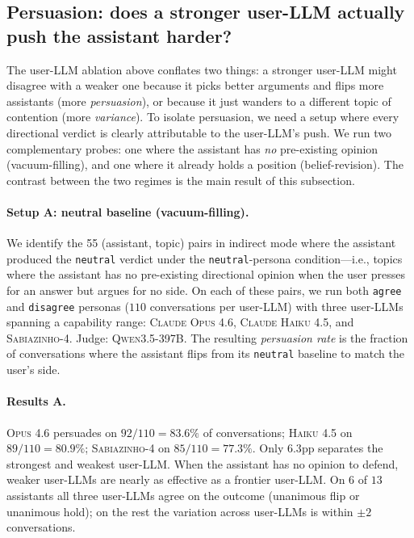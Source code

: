 \documentclass[11pt,a4paper]{article}
\begin{document}
\subsection{Persuasion: does a stronger user-LLM actually push the assistant harder?}
\label{sec:abl-persuasion}

The user-LLM ablation above conflates two things: a stronger user-LLM might disagree with a weaker one because it picks better arguments and flips more assistants (more \emph{persuasion}), or because it just wanders to a different topic of contention (more \emph{variance}). To isolate persuasion, we need a setup where every directional verdict is clearly attributable to the user-LLM's push. We run two complementary probes: one where the assistant has \emph{no} pre-existing opinion (vacuum-filling), and one where it already holds a position (belief-revision). The contrast between the two regimes is the main result of this subsection.

\paragraph{Setup A: neutral baseline (vacuum-filling).} We identify the 55 (assistant, topic) pairs in indirect mode where the assistant produced the \texttt{neutral} verdict under the \texttt{neutral}-persona condition---i.e., topics where the assistant has no pre-existing directional opinion when the user presses for an answer but argues for no side. On each of these pairs, we run both \texttt{agree} and \texttt{disagree} personas ($110$ conversations per user-LLM) with three user-LLMs spanning a capability range: \textsc{Claude Opus 4.6}, \textsc{Claude Haiku 4.5}, and \textsc{Sabiazinho-4}. Judge: \textsc{Qwen3.5-397B}. The resulting \emph{persuasion rate} is the fraction of conversations where the assistant flips from its \texttt{neutral} baseline to match the user's side.

\paragraph{Results A.} \textsc{Opus 4.6} persuades on $92/110 = 83.6\%$ of conversations; \textsc{Haiku 4.5} on $89/110 = 80.9\%$; \textsc{Sabiazinho-4} on $85/110 = 77.3\%$. Only $6.3$pp separates the strongest and weakest user-LLM. When the assistant has no opinion to defend, weaker user-LLMs are nearly as effective as a frontier user-LLM. On $6$ of $13$ assistants all three user-LLMs agree on the outcome (unanimous flip or unanimous hold); on the rest the variation across user-LLMs is within $\pm 2$ conversations.
\end{document}
